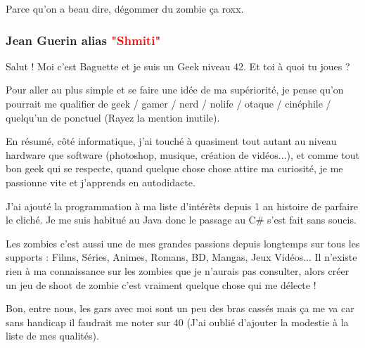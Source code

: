 \documentclass{article}
\begin{document}
\par
Parce qu’on a beau dire, dégommer du zombie ça roxx.
\newline

\subsubsection{Jean Guerin alias \textcolor{red}{"Shmiti"}}

\par
Salut ! Moi c'est Baguette et je suis un Geek niveau 42. Et toi à quoi tu joues ?
\newline

\par
Pour aller au plus simple et se faire une idée de ma supériorité, je pense qu'on pourrait me qualifier de geek / gamer / nerd / nolife / otaque / cinéphile / quelqu'un de ponctuel (Rayez la mention inutile).
\newline

\par
En résumé, côté informatique, j'ai touché à quasiment tout autant au niveau hardware que software (photoshop, musique, création de vidéos...), et comme tout bon geek qui se respecte, quand quelque chose chose attire ma curiosité, je me passionne vite et j'apprends en autodidacte.
\newline


\par

\par
J'ai ajouté la programmation à ma liste d'intérêts depuis 1 an histoire de parfaire le cliché.  Je me suis habitué au Java donc le passage au C\# s'est fait sans soucis. 
\newline

\par
Les zombies c'est aussi une de mes grandes passions depuis longtemps sur tous les supports : Films, Séries, Animes, Romans, BD, Mangas, Jeux Vidéos...  Il n'existe rien à ma connaissance sur les zombies que je n'aurais pas consulter, alors créer un jeu de shoot de zombie c'est vraiment quelque chose qui me délecte !
\newline

\fontsize{9}{9}
\par
\small Bon, entre nous, les gars avec moi sont un peu des bras cassés mais ça me va car sans handicap il faudrait me noter sur 40 (J’ai oublié d'ajouter la modestie à la liste de mes qualités).
\newline
\end{document}

